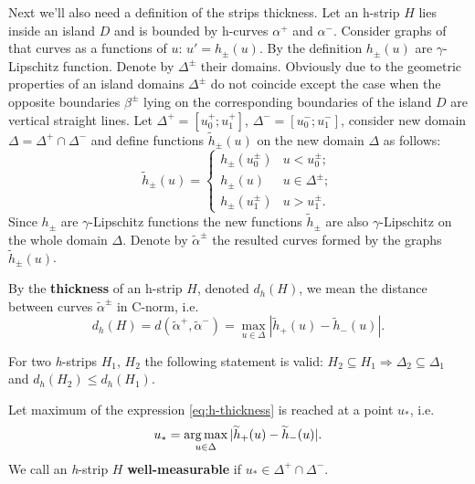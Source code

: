 Next we'll also need a definition of the strips thickness.
Let an h-strip $H$ lies inside an island $D$ and is bounded by h-curves $\alpha^+$ and $\alpha^-$.
Consider graphs of that curves as a functions of $u$: $u' = h_{\pm}(u)$.
By the definition $h_{\pm}(u)$ are $\gamma$-Lipschitz function.
Denote by $\Delta^{\pm}$ their domains.
Obviously due to the geometric properties of an island domains $\Delta^{\pm}$ do not coincide except the case when the opposite boundaries $\beta^{\pm}$ lying on the corresponding boundaries of the island $D$ are vertical straight lines.
Let $\Delta^+ = [u_0^+; u_1^+]$, $\Delta^- = [u_0^-; u_1^-]$, consider new domain $\Delta = \Delta^+ \cap \Delta^-$ and define functions $\widetilde{h}_{\pm}(u)$ on the new domain $\Delta$ as follows:
\begin{equation}
	\widetilde{h}_{\pm}(u) = \begin{cases}
		h_{\pm}(u_0^{\pm}) & u < u_0^{\pm}; \\
		h_{\pm}(u) & u \in \Delta^{\pm}; \\
		h_{\pm}(u_1^{\pm}) & u > u_1^{\pm}.
	\end{cases}
\label{eq:continuation}
\end{equation}
Since $h_{\pm}$ are $\gamma$-Lipschitz functions the new functions $\widetilde{h}_{\pm}$ are also $\gamma$-Lipschitz on the whole domain $\Delta$.
Denote by $\widetilde{\alpha}^{\pm}$ the resulted curves formed by the graphs $\widetilde{h}_{\pm}(u)$.

\begin{definition}
	By the {\bf thickness} of an h-strip $H$, denoted $d_h(H)$, we mean the distance between curves $\widetilde{\alpha}^{\pm}$ in C-norm, i.e.
	\begin{equation}
		d_h(H) = d(\widetilde{\alpha}^+, \widetilde{\alpha}^-) = \max \limits_{u \in \Delta} |\widetilde{h}_+(u) - \widetilde{h}_-(u)|.
	\label{eq:h-thickness}
	\end{equation}
\end{definition}

\begin{remark}
	For two \emph{h}-strips $H_1$, $H_2$ the following statement is valid: $H_2 \subseteq H_1 \Rightarrow \Delta_2 \subseteq \Delta_1$ and $d_h(H_2) \le d_h(H_1)$.
\end{remark}

\begin{definition}
	Let maximum of the expression \eqref{eq:h-thickness} is reached at a point $u_*$, i.e.
	\begin{equation}
		u_* = \operatorname*{arg\,max} \limits_{u \in \Delta} |\widetilde{h}_+(u) - \widetilde{h}_-(u)|.
	\label{eq:argmax}
	\end{equation}
	We call an \emph{h}-strip $H$ {\bf well-measurable} if $u_* \in \Delta^+ \cap \Delta^-$.
\label{def:well-measurable}
\end{definition}

